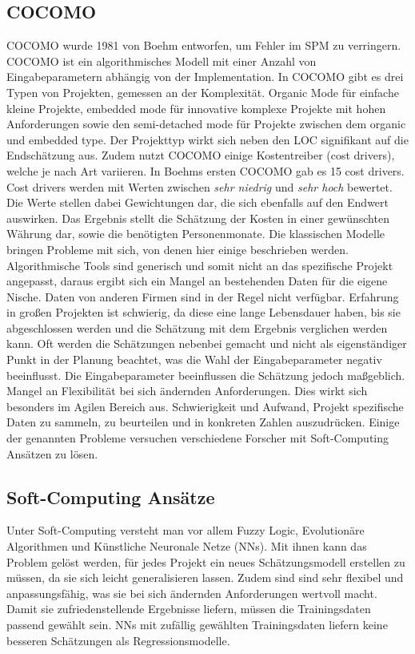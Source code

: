 \subsection{COCOMO}
 COCOMO wurde 1981 von Boehm entworfen, um Fehler im SPM zu verringern. COCOMO ist ein algorithmisches Modell mit einer Anzahl von Eingabeparametern abhängig von der Implementation. In COCOMO gibt es drei Typen von Projekten, gemessen an der Komplexität. Organic Mode für einfache kleine Projekte, embedded mode für innovative komplexe Projekte mit hohen Anforderungen sowie den semi-detached mode für Projekte zwischen dem organic und embedded type. Der Projekttyp wirkt sich neben den LOC signifikant auf die Endschätzung aus. Zudem nutzt COCOMO einige Kostentreiber (cost drivers), welche je nach Art variieren. In Boehms ersten COCOMO gab es 15 cost drivers. Cost drivers werden mit Werten zwischen \textit{sehr niedrig} und \textit{sehr hoch} bewertet. Die Werte stellen dabei Gewichtungen dar, die sich ebenfalls auf den Endwert auswirken. Das Ergebnis stellt die Schätzung der Kosten in einer gewünschten Währung dar, sowie die benötigten Personenmonate. Die klassischen Modelle bringen Probleme mit sich, von denen hier einige beschrieben werden.
 \\
Algorithmische Tools sind generisch und somit nicht an das spezifische Projekt angepasst, daraus ergibt sich ein Mangel an bestehenden Daten für die eigene Nische. Daten von anderen Firmen sind in der Regel nicht verfügbar. Erfahrung in großen Projekten ist schwierig, da diese eine lange Lebensdauer haben, bis sie abgeschlossen werden und die Schätzung mit dem Ergebnis verglichen werden kann. Oft werden die Schätzungen nebenbei gemacht und nicht als eigenständiger Punkt in der Planung beachtet, was die Wahl der Eingabeparameter negativ beeinflusst. Die Eingabeparameter beeinflussen die Schätzung jedoch maßgeblich. Mangel an Flexibilität bei sich ändernden Anforderungen. Dies wirkt sich besonders im Agilen Bereich aus. Schwierigkeit und Aufwand, Projekt spezifische Daten zu sammeln, zu beurteilen und in konkreten Zahlen auszudrücken. Einige der genannten Probleme versuchen verschiedene Forscher mit Soft-Computing Ansätzen zu lösen\cite{Bilgaiyan2016}\cite{Chen2005}\cite{Heemstra1992}\cite{Abrahamsson2007}.

\subsection{Soft-Computing Ansätze}
Unter Soft-Computing versteht man vor allem Fuzzy Logic, Evolutionäre Algorithmen und Künstliche Neuronale Netze (NNs). Mit ihnen kann das Problem gelöst werden, für jedes Projekt ein neues Schätzungsmodell erstellen zu müssen, da sie sich leicht generalisieren lassen. Zudem sind sind sehr flexibel und anpassungsfähig, was sie bei sich ändernden Anforderungen wertvoll macht.\cite{Boetticher2001} Damit sie zufriedenstellende Ergebnisse liefern, müssen die Trainingsdaten passend gewählt sein. NNs mit zufällig gewählten Trainingsdaten liefern keine besseren Schätzungen als Regressionsmodelle. \cite{Setyawati2002}
\\
\\
\\
